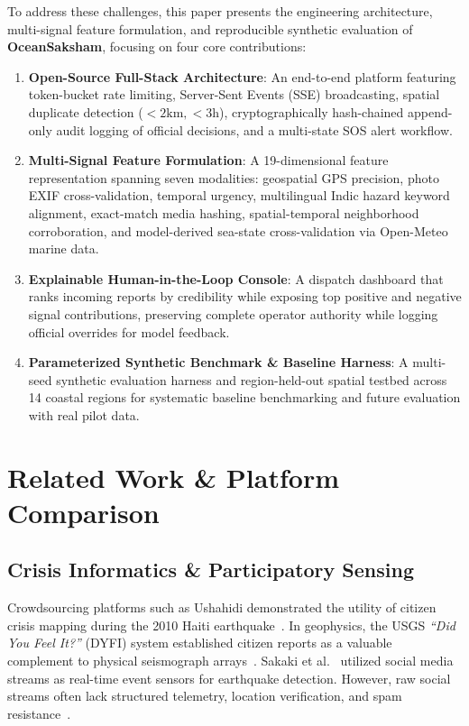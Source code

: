 \documentclass[conference]{IEEEtran}
\begin{document}
To address these challenges, this paper presents the engineering architecture, multi-signal feature formulation, and reproducible synthetic evaluation of \textbf{OceanSaksham}, focusing on four core contributions:
\begin{enumerate}
    \item \textbf{Open-Source Full-Stack Architecture}: An end-to-end platform featuring token-bucket rate limiting, Server-Sent Events (SSE) broadcasting, spatial duplicate detection ($<2\text{km}, <3\text{h}$), cryptographically hash-chained append-only audit logging of official decisions, and a multi-state SOS alert workflow.
    \item \textbf{Multi-Signal Feature Formulation}: A 19-dimensional feature representation spanning seven modalities: geospatial GPS precision, photo EXIF cross-validation, temporal urgency, multilingual Indic hazard keyword alignment, exact-match media hashing, spatial-temporal neighborhood corroboration, and model-derived sea-state cross-validation via Open-Meteo marine data.
    \item \textbf{Explainable Human-in-the-Loop Console}: A dispatch dashboard that ranks incoming reports by credibility while exposing top positive and negative signal contributions, preserving complete operator authority while logging official overrides for model feedback.
    \item \textbf{Parameterized Synthetic Benchmark \& Baseline Harness}: A multi-seed synthetic evaluation harness and region-held-out spatial testbed across 14 coastal regions for systematic baseline benchmarking and future evaluation with real pilot data.
\end{enumerate}

\section{Related Work \& Platform Comparison}
\subsection{Crisis Informatics \& Participatory Sensing}
Crowdsourcing platforms such as Ushahidi demonstrated the utility of citizen crisis mapping during the 2010 Haiti earthquake~\cite{okolloh2009ushahidi}. In geophysics, the USGS \textit{``Did You Feel It?''} (DYFI) system established citizen reports as a valuable complement to physical seismograph arrays~\cite{wald1999utilization}. Sakaki et al.~\cite{sakaki2010earthquake} utilized social media streams as real-time event sensors for earthquake detection. However, raw social streams often lack structured telemetry, location verification, and spam resistance~\cite{reuter2018fifteen}.
\end{document}
